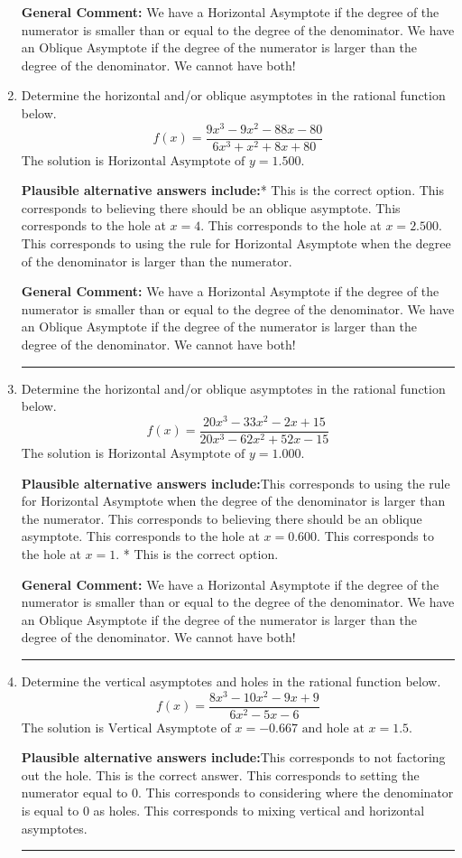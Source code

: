 \documentclass{extbook}[14pt]
\newcommand{\litem}[1]{\item #1

\rule{\textwidth}{0.4pt}}
\begin{document}
\begin{enumerate}
{\textbf{General Comment:} We have a Horizontal Asymptote if the degree of the numerator is smaller than or equal to the degree of the denominator. We have an Oblique Asymptote if the degree of the numerator is larger than the degree of the denominator. We cannot have both!
}
\litem{
Determine the horizontal and/or oblique asymptotes in the rational function below.
\[ f(x) = \frac{9x^{3} -9 x^{2} -88 x -80}{6x^{3} + x^{2} +8 x + 80} \]The solution is \( \text{Horizontal Asymptote of } y = 1.500  \).\begin{enumerate}[label=\Alph*.]
\textbf{Plausible alternative answers include:}* This is the correct option.
This corresponds to believing there should be an oblique asymptote.
This corresponds to the hole at $x = 4$.
This corresponds to the hole at $x = 2.500$.
This corresponds to using the rule for Horizontal Asymptote when the degree of the denominator is larger than the numerator.
\end{enumerate}

\textbf{General Comment:} We have a Horizontal Asymptote if the degree of the numerator is smaller than or equal to the degree of the denominator. We have an Oblique Asymptote if the degree of the numerator is larger than the degree of the denominator. We cannot have both!
}
\litem{
Determine the horizontal and/or oblique asymptotes in the rational function below.
\[ f(x) = \frac{20x^{3} -33 x^{2} -2 x + 15}{20x^{3} -62 x^{2} +52 x -15} \]The solution is \( \text{Horizontal Asymptote of } y = 1.000  \).\begin{enumerate}[label=\Alph*.]
\textbf{Plausible alternative answers include:}This corresponds to using the rule for Horizontal Asymptote when the degree of the denominator is larger than the numerator.
This corresponds to believing there should be an oblique asymptote.
This corresponds to the hole at $x = 0.600$.
This corresponds to the hole at $x = 1$.
* This is the correct option.
\end{enumerate}

\textbf{General Comment:} We have a Horizontal Asymptote if the degree of the numerator is smaller than or equal to the degree of the denominator. We have an Oblique Asymptote if the degree of the numerator is larger than the degree of the denominator. We cannot have both!
}
\litem{
Determine the vertical asymptotes and holes in the rational function below.
\[ f(x) = \frac{8x^{3} -10 x^{2} -9 x + 9}{6x^{2} -5 x -6} \]The solution is \( \text{Vertical Asymptote of } x = -0.667 \text{ and hole at } x = 1.5 \).\begin{enumerate}[label=\Alph*.]
\textbf{Plausible alternative answers include:}This corresponds to not factoring out the hole.
This is the correct answer.
This corresponds to setting the numerator equal to 0.
This corresponds to considering where the denominator is equal to 0 as holes.
This corresponds to mixing vertical and horizontal asymptotes.
\end{enumerate}

}
\end{enumerate}
\end{document}
